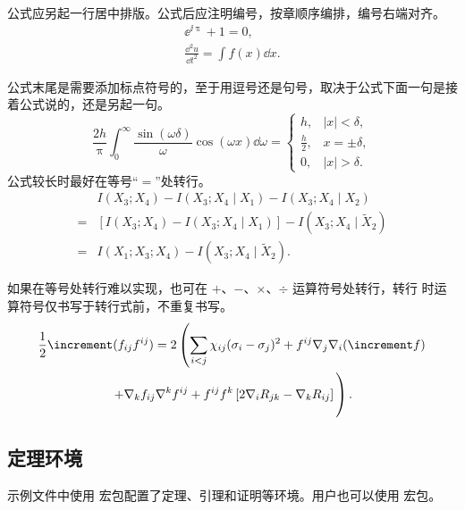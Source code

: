 公式应另起一行居中排版。公式后应注明编号，按章顺序编排，编号右端对齐。
\begin{gather}
  \ee^{\ii\uppi} + 1 = 0, \\
  \frac{\dd^2 u}{\dd t^2} = \int f(x) \dd x.
\end{gather}

公式末尾是需要添加标点符号的，至于用逗号还是句号，取决于公式下面一句是接着公式说的，还是另起一句。
\begin{equation}
  \frac{2h}{\uppi}\int_{0}^{\infty}\frac{\sin\left( \omega\delta \right)}{\omega}
  \cos\left( \omega x \right) \dd\omega = 
  \begin{cases}
    h, & \left| x \right| < \delta, \\
    \frac{h}{2}, & x = \pm \delta, \\
    0, & \left| x \right| > \delta.
  \end{cases}
\end{equation}
公式较长时最好在等号“$=$”处转行。
\begin{align}
    & I (X_3; X_4) - I (X_3; X_4 \mid X_1) - I (X_3; X_4 \mid X_2) \nonumber \\
  = & [I (X_3; X_4) - I (X_3; X_4 \mid X_1)] - I (X_3; X_4 \mid \tilde{X}_2) \\
  = & I (X_1; X_3; X_4) - I (X_3; X_4 \mid \tilde{X}_2).
\end{align}

如果在等号处转行难以实现，也可在 $+$、$-$、$\times$、$\div$ 运算符号处转行，转行
时运算符号仅书写于转行式前，不重复书写。
\begin{multline}
  \frac{1}{2} \increment (f_{ij} f^{ij}) =
    2 \left(\sum_{i<j} \chi_{ij}(\sigma_{i} - \sigma_{j})^{2}
    + f^{ij} \nabla_{j} \nabla_{i} (\increment f) \right. \\
  \left. + \nabla_{k} f_{ij} \nabla^{k} f^{ij} +
    f^{ij} f^{k} \left[2\nabla_{i}R_{jk}
    - \nabla_{k} R_{ij} \right] \vphantom{\sum_{i<j}} \right).
\end{multline}

\subsection{定理环境}

示例文件中使用  宏包配置了定理、引理和证明等环境。用户也可以使用
 宏包。

